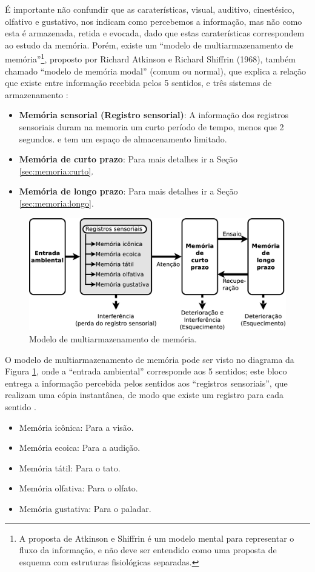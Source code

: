 É importante não confundir que as caraterísticas, visual, auditivo, cinestésico, olfativo e gustativo,
nos indicam como percebemos a informação, mas não como esta é armazenada, retida e evocada,
dado que estas caraterísticas correspondem ao estudo da memória.  
Porém, existe um ``modelo de multiarmazenamento de memória''\footnote{A 
proposta de Atkinson e Shiffrin é um modelo mental para representar o fluxo da informação, 
e não deve ser entendido como uma proposta de esquema com estruturas fisiológicas separadas.}, 
proposto por Richard Atkinson e Richard Shiffrin (1968),
também chamado ``modelo de memória modal'' (comum ou normal),
que explica a relação que existe entre informação recebida pelos 5 sentidos,
e três sistemas de armazenamento  
\cite{10.2307/24922803} \cite[pp. 158]{sternbergpsicologia} \cite[pp. 32]{de2000comprension} \cite{pake2019psicologia}:
\begin{itemize} 
\item \textbf{Memória sensorial (Registro sensorial)}: A informação dos registros sensoriais duram na memoria um curto período de tempo, menos que 2 segundos.
e tem um espaço de almacenamento limitado.
\item \textbf{Memória de curto prazo}: Para mais detalhes ir a Seção \ref{sec:memoria:curto}.
\item \textbf{Memória de longo prazo}: Para mais detalhes ir a Seção \ref{sec:memoria:longo}.
\end{itemize}

\begin{figure}[!h]
  \centering
    \includegraphics[width=\textwidth]{chapters/cap-learning/sentidos-memoria.eps} 
  \caption{Modelo de multiarmazenamento de memória.}
\label{fig:sentidos-memoria}
\end{figure}
O modelo de multiarmazenamento de memória pode ser visto no diagrama da Figura \ref{fig:sentidos-memoria},
onde a ``entrada ambiental'' corresponde aos 5 sentidos;
este bloco entrega a informação percebida pelos sentidos aos ``registros sensoriais'', 
que realizam uma cópia instantânea,
de modo que existe um registro para cada sentido \cite[pp. 158-159]{sternbergpsicologia}  \cite{pake2019psicologia}.
\begin{itemize}
\item Memória icônica: Para a visão.
\item Memória ecoica: Para a audição.
\item Memória tátil: Para o tato.
\item Memória olfativa: Para o olfato.
\item Memória gustativa: Para o paladar.
\end{itemize} 

